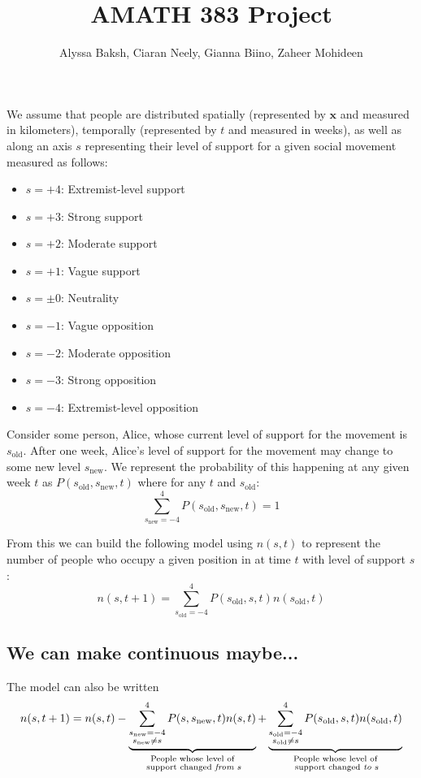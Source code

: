 \documentclass{article}
\title{AMATH 383 Project}
\author{
    Alyssa Baksh, 
    Ciaran Neely,
    Gianna Biino,
    Zaheer Mohideen
}
\begin{document}
    \maketitle

    

    We assume that people are distributed spatially (represented by $\bm x$ and measured in kilometers), temporally (represented by $t$ and measured in weeks), as well as along an axis $s$ representing their level of support for a given social movement measured as follows:
    \begin{itemize}
        \item $s=+4$: Extremist-level support
        \item $s=+3$: Strong support
        \item $s=+2$: Moderate support
        \item $s=+1$: Vague support
        \item $s=\pm 0$: Neutrality
        \item $s=-1$: Vague opposition
        \item $s=-2$: Moderate opposition
        \item $s=-3$: Strong opposition
        \item $s=-4$: Extremist-level opposition
    \end{itemize}

    \newcommand{\sold}{s_{\text{old}}}
    \newcommand{\snew}{s_{\text{new}}}
    Consider some person, Alice, whose current level of support for the movement is $\sold$. After one week, Alice's level of support for the movement may change to some new level $\snew$. We represent the probability of this happening at any given week $t$ as $P(\sold, \snew, t)$ where for any $t$ and $\sold$:
    \[
        \sum_{\snew=-4}^4 P(\sold,\snew,t)=1
    \]
    
    From this we can build the following model using $n(s,t)$ to represent the number of people who occupy a given position in at time $t$ with level of support $s$:
    \[
        n(s,t+1)= \sum_{\sold=-4}^{4}P(\sold,s,t) n(\sold,t)
    \]
    \subsection{We can make continuous maybe...}
    The model can also be written
    \[
        n(s,t+1)=n(s,t)-\underbrace{\sum_{\substack{\snew=-4\\ \snew\ne s}}^4P(s,\snew,t)n(s,t)}_{\substack{\text{People whose level of}\\ \text{ support changed  \emph{from} $s$}}}+\underbrace{\sum_{\substack{\sold=-4 \\ \sold\ne s}}^{4}P(\sold,s,t) n(\sold,t)}_{\substack{\text{People whose level of}\\ \text{ support changed \emph{to} $s$}}}
    \]
    
\end{document}
